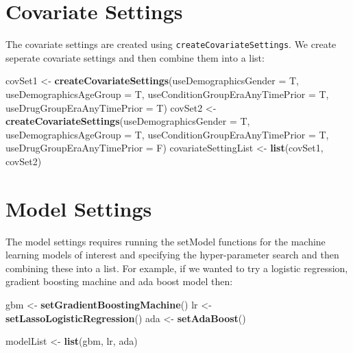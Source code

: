 \documentclass[]{article}
\newenvironment{Shaded}{\begin{snugshade}}{\end{snugshade}}
\newcommand{\KeywordTok}[1]{\textcolor[rgb]{0.13,0.29,0.53}{\textbf{#1}}}
\newcommand{\DataTypeTok}[1]{\textcolor[rgb]{0.13,0.29,0.53}{#1}}
\newcommand{\StringTok}[1]{\textcolor[rgb]{0.31,0.60,0.02}{#1}}
\newcommand{\NormalTok}[1]{#1}
\begin{document}
\section{Covariate Settings}\label{covariate-settings}

The covariate settings are created using
\texttt{createCovariateSettings}. We create seperate covariate settings
and then combine them into a list:

\begin{Shaded}
\begin{Highlighting}[]
\NormalTok{covSet1 <-}\StringTok{ }\KeywordTok{createCovariateSettings}\NormalTok{(}\DataTypeTok{useDemographicsGender =}\NormalTok{ T, }
                                   \DataTypeTok{useDemographicsAgeGroup =}\NormalTok{ T, }
                                   \DataTypeTok{useConditionGroupEraAnyTimePrior =}\NormalTok{ T,}
                                   \DataTypeTok{useDrugGroupEraAnyTimePrior =}\NormalTok{ T)}
\NormalTok{covSet2 <-}\StringTok{ }\KeywordTok{createCovariateSettings}\NormalTok{(}\DataTypeTok{useDemographicsGender =}\NormalTok{ T, }
                                   \DataTypeTok{useDemographicsAgeGroup =}\NormalTok{ T, }
                                   \DataTypeTok{useConditionGroupEraAnyTimePrior =}\NormalTok{ T,}
                                   \DataTypeTok{useDrugGroupEraAnyTimePrior =}\NormalTok{ F)}
\NormalTok{covariateSettingList <-}\StringTok{ }\KeywordTok{list}\NormalTok{(covSet1, covSet2)}
\end{Highlighting}
\end{Shaded}

\section{Model Settings}\label{model-settings}

The model settings requires running the setModel functions for the
machine learning models of interest and specifying the hyper-parameter
search and then combining these into a list. For example, if we wanted
to try a logistic regression, gradient boosting machine and ada boost
model then:

\begin{Shaded}
\begin{Highlighting}[]
\NormalTok{gbm <-}\StringTok{ }\KeywordTok{setGradientBoostingMachine}\NormalTok{()}
\NormalTok{lr <-}\StringTok{ }\KeywordTok{setLassoLogisticRegression}\NormalTok{()}
\NormalTok{ada <-}\StringTok{ }\KeywordTok{setAdaBoost}\NormalTok{()}

\NormalTok{modelList <-}\StringTok{ }\KeywordTok{list}\NormalTok{(gbm, lr, ada)}
\end{Highlighting}
\end{Shaded}
\end{document}
